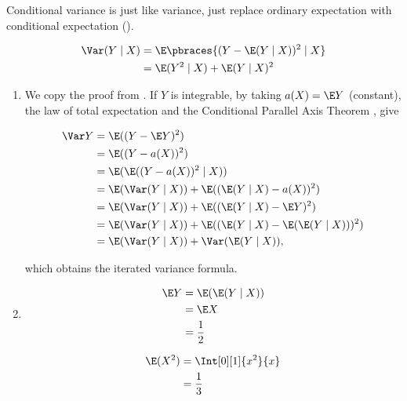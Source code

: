 \begin{solution}

Conditional variance is just like variance, just replace ordinary expectation with conditional expectation (\cite[Lecture 4, Slide 31]{EStat}).

\begin{align*}
    \Var(Y \mid X)
    & =
    \E \pbraces{(Y - \E(Y \mid X))^2 \mid X} \\
    & =
    \E(Y^2 \mid X) + \E(Y \mid X)^2
\end{align*}

\begin{enumerate}[label = (\alph*)]

    \item We copy the proof from \cite[Lecture 4, Slide 31]{EStat}.
    If $Y$ is integrable, by taking $a(X) = \E Y$ (constant), the law of total expectation and the Conditional Parallel Axis Theorem \cite[Lecture 4, Slide 30]{EStat}, give

    \begin{align*}
        \Var Y
        & =
        \E((Y - \E Y)^2) \\
        & =
        \E((Y - a(X))^2) \\
        & =
        \E(\E((Y - a(X))^2 \mid X)) \\
        & =
        \E(\Var(Y \mid X)) + \E((\E(Y \mid X) - a(X))^2) \\
        & =
        \E(\Var(Y \mid X)) + \E((\E(Y \mid X) - \E Y)^2) \\
        & =
        \E(\Var(Y \mid X)) + \E((\E(Y \mid X) - \E(\E(Y \mid X)))^2) \\
        & =
        \E(\Var(Y \mid X)) + \Var(\E(Y \mid X)),
    \end{align*}

    which obtains the iterated variance formula.

    \item

    \begin{align*}
        \E Y
        & =
        \E(\E(Y \mid X)) \\
        & =
        \E X \\
        & =
        \frac{1}{2}
    \end{align*}

    \begin{align*}
        \E(X^2)
        & =
        \Int[0][1]{x^2}{x} \\
        & =
        \frac{1}{3}
    \end{align*}


\end{enumerate}
\end{solution}
